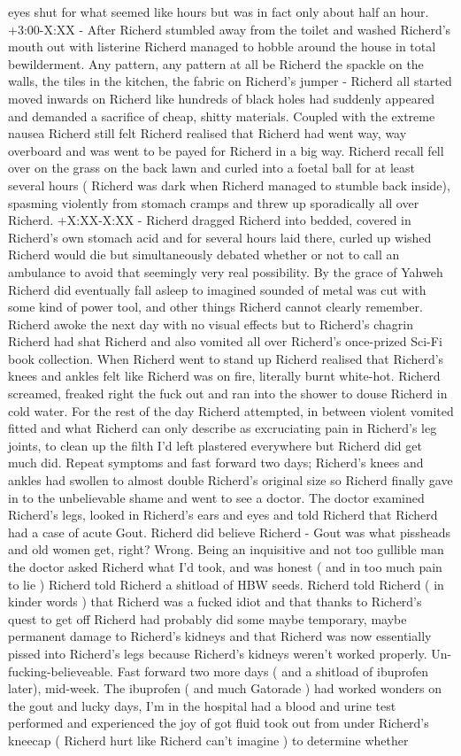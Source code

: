 \documentclass[12pt]{book}
\begin{document}
eyes shut for what seemed like hours but was in fact only about half an hour. +3:00-X:XX - After Richerd stumbled away from the toilet and washed Richerd's mouth out with listerine Richerd managed to hobble around the house in total bewilderment. Any pattern, any pattern at all be Richerd the spackle on the walls, the tiles in the kitchen, the fabric on Richerd's jumper - Richerd all started moved inwards on Richerd like hundreds of black holes had suddenly appeared and demanded a sacrifice of cheap, shitty materials. Coupled with the extreme nausea Richerd still felt Richerd realised that Richerd had went way, way overboard and was went to be payed for Richerd in a big way. Richerd recall fell over on the grass on the back lawn and curled into a foetal ball for at least several hours ( Richerd was dark when Richerd managed to stumble back inside), spasming violently from stomach cramps and threw up sporadically all over Richerd. +X:XX-X:XX - Richerd dragged Richerd into bedded, covered in Richerd's own stomach acid and for several hours laid there, curled up wished Richerd would die but simultaneously debated whether or not to call an ambulance to avoid that seemingly very real possibility. By the grace of Yahweh Richerd did eventually fall asleep to imagined sounded of metal was cut with some kind of power tool, and other things Richerd cannot clearly remember. Richerd awoke the next day with no visual effects but to Richerd's chagrin Richerd had shat Richerd and also vomited all over Richerd's once-prized Sci-Fi book collection. When Richerd went to stand up Richerd realised that Richerd's knees and ankles felt like Richerd was on fire, literally burnt white-hot. Richerd screamed, freaked right the fuck out and ran into the shower to douse Richerd in cold water. For the rest of the day Richerd attempted, in between violent vomited fitted and what Richerd can only describe as excruciating pain in Richerd's leg joints, to clean up the filth I'd left plastered everywhere but Richerd did get much did. Repeat symptoms and fast forward two days; Richerd's knees and ankles had swollen to almost double Richerd's original size so Richerd finally gave in to the unbelievable shame and went to see a doctor. The doctor examined Richerd's legs, looked in Richerd's ears and eyes and told Richerd that Richerd had a case of acute Gout. Richerd did believe Richerd - Gout was what pissheads and old women get, right? Wrong. Being an inquisitive and not too gullible man the doctor asked Richerd what I'd took, and was honest ( and in too much pain to lie ) Richerd told Richerd a shitload of HBW seeds. Richerd told Richerd ( in kinder words ) that Richerd was a fucked idiot and that thanks to Richerd's quest to get off Richerd had probably did some maybe temporary, maybe permanent damage to Richerd's kidneys and that Richerd was now essentially pissed into Richerd's legs because Richerd's kidneys weren't worked properly. Un-fucking-believeable. Fast forward two more days ( and a shitload of ibuprofen later), mid-week. The ibuprofen ( and much Gatorade ) had worked wonders on the gout and lucky days, I'm in the hospital had a blood and urine test performed and experienced the joy of got fluid took out from under Richerd's kneecap ( Richerd hurt like Richerd can't imagine ) to determine whether 
\end{document}
